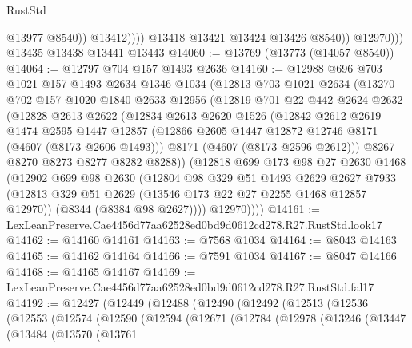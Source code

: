 \begin{lexlean}{RustStd}
\begin{coremodule}
                          @13977
                          @8540))
                      @13412))))
              @13418
              @13421
              @13424
              @13426
              @8540))
          @12970)))
    @13435
    @13438
    @13441
    @13443
@14060 := @13769 (@13773 (@14057 @8540))
@14064 := @12797 @704 @157 @1493 @2636
@14160 := @12988
    @696
    @703
    @1021
    @157
    @1493
    @2634
    @1346
    @1034
    (@12813
      @703
      @1021
      @2634
      (@13270
        @702
        @157
        @1020
        @1840
        @2633
        @12956
        (@12819
          @701
          @22
          @442
          @2624
          @2632
          (@12828
            @2613
            @2622
            (@12834
              @2613
              @2620
              @1526
              (@12842
                @2612
                @2619
                @1474
                @2595
                @1447
                @12857
                (@12866 @2605 @1447 @12872 @12746 @8171 (@4607 (@8173 @2606 @1493)))
                @8171
                (@4607 (@8173 @2596 @2612)))
              @8267
              @8270
              @8273
              @8277
              @8282
              @8288))
          (@12818
            @699
            @173
            @98
            @27
            @2630
            @1468
            (@12902
              @699
              @98
              @2630
              (@12804
                @98
                @329
                @51
                @1493
                @2629
                @2627
                @7933
                (@12813 @329 @51 @2629 (@13546 @173 @22 @27 @2255 @1468 @12857 @12970))
                (@8344 (@8384 @98 @2627))))
            @12970))))
@14161 := LexLeanPreserve.Cae4456d77aa62528ed0bd9d0612cd278.R27.RustStd.look17
@14162 := @14160 @14161
@14163 := @7568 @1034
@14164 := @8043 @14163
@14165 := @14162 @14164
@14166 := @7591 @1034
@14167 := @8047 @14166
@14168 := @14165 @14167
@14169 := LexLeanPreserve.Cae4456d77aa62528ed0bd9d0612cd278.R27.RustStd.fal17
@14192 := @12427
    (@12449
      (@12488
        (@12490
          (@12492
            (@12513
              (@12536
                (@12553
                  (@12574
                    (@12590
                      (@12594
                        (@12671
                          (@12784
                            (@12978
                              (@13246
                                (@13447
                                  (@13484
                                    (@13570
                                      (@13761

\end{coremodule}
\end{lexlean}
